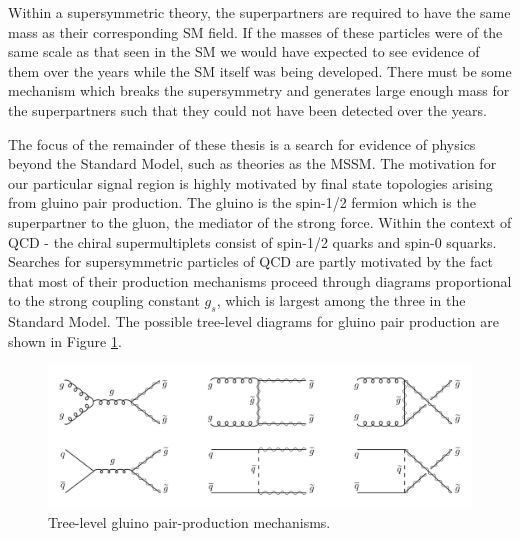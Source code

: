 Within a supersymmetric theory, the superpartners are required to have the same mass as their corresponding SM field. If the masses of these particles were of the same scale as that seen in the SM we would have expected to see evidence of them over the years while the SM itself was being developed. There must be some mechanism which breaks the supersymmetry and generates large enough mass for the superpartners such that they could not have been detected over the years.

The focus of the remainder of these thesis is a search for evidence of physics beyond the Standard Model, such as theories as the MSSM. The motivation for our particular signal region is highly motivated by final state topologies arising from gluino pair production. The gluino is the spin-1/2 fermion which is the superpartner to the gluon, the mediator of the strong force. Within the context of QCD - the chiral supermultiplets consist of spin-1/2 quarks and spin-0 squarks. Searches for supersymmetric particles of QCD are partly motivated by the fact that most of their production mechanisms proceed through diagrams proportional to the strong coupling constant $g_{s}$, which is largest among the three in the Standard Model. The possible tree-level diagrams for gluino pair production are shown in Figure \ref{fig:gluinopair}.

\begin{figure}[hb!]
\centering
\includegraphics[width=\textwidth]{figs/gluinopair}
\caption{Tree-level gluino pair-production mechanisms.}
\label{fig:gluinopair}
\end{figure}
